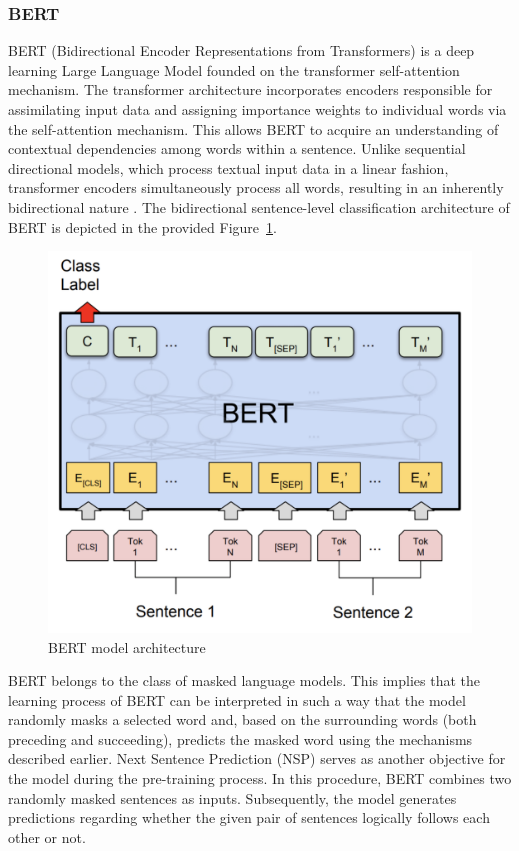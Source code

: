 \subsubsection{BERT}
BERT (Bidirectional Encoder Representations from Transformers) is a deep learning Large Language Model founded on the transformer self-attention mechanism. The transformer architecture incorporates encoders responsible for assimilating input data and assigning importance weights to individual words via the self-attention mechanism. This allows BERT to acquire an understanding of contextual dependencies among words within a sentence. Unlike sequential directional models, which process textual input data in a linear fashion, transformer encoders simultaneously process all words, resulting in an inherently bidirectional nature \autocite{Vaswani2017}. The bidirectional sentence-level classification architecture of BERT is depicted in the provided Figure~\ref{bert_architecture}.

\begin{figure}[hbt!]
\centering
\includegraphics[width=0.75\linewidth]{bert_architecture.png}
\caption{BERT model architecture \autocite{Devlin2018}}
\label{bert_architecture}
\end{figure}

BERT belongs to the class of masked language models. This implies that the learning process of BERT can be interpreted in such a way that the model randomly masks a selected word and, based on the surrounding words (both preceding and succeeding), predicts the masked word using the mechanisms described earlier. 
Next Sentence Prediction (NSP) serves as another objective for the model during the pre-training process. In this procedure, BERT combines two randomly masked sentences as inputs. Subsequently, the model generates predictions regarding whether the given pair of sentences logically follows each other or not.

